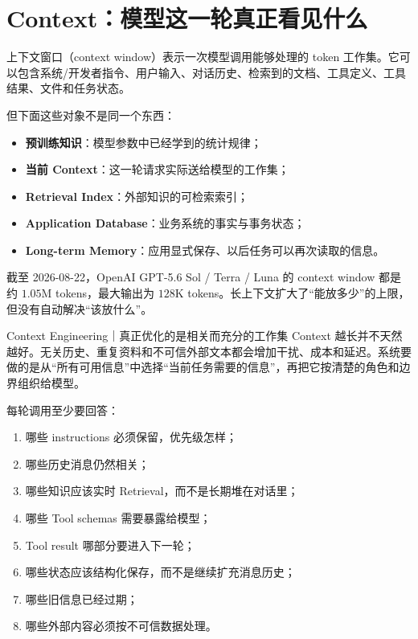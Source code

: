 \documentclass[profile=standard,twoside=false]{ipara-handbook}
\begin{document}
\section{Context：模型这一轮真正看见什么}

上下文窗口（context window）表示一次模型调用能够处理的 token 工作集。它可以包含系统/开发者指令、用户输入、对话历史、检索到的文档、工具定义、工具结果、文件和任务状态。

但下面这些对象不是同一个东西：

\begin{itemize}
  \item \textbf{预训练知识}：模型参数中已经学到的统计规律；
  \item \textbf{当前 Context}：这一轮请求实际送给模型的工作集；
  \item \textbf{Retrieval Index}：外部知识的可检索索引；
  \item \textbf{Application Database}：业务系统的事实与事务状态；
  \item \textbf{Long-term Memory}：应用显式保存、以后任务可以再次读取的信息。
\end{itemize}

截至 2026-08-22，OpenAI GPT-5.6 Sol / Terra / Luna 的 context window 都是约 $1.05$M tokens，最大输出为 $128$K tokens。长上下文扩大了“能放多少”的上限，但没有自动解决“该放什么”。

\begin{mechanism}{Context Engineering｜真正优化的是相关而充分的工作集}
Context 越长并不天然越好。无关历史、重复资料和不可信外部文本都会增加干扰、成本和延迟。系统要做的是从“所有可用信息”中选择“当前任务需要的信息”，再把它按清楚的角色和边界组织给模型。
\end{mechanism}

每轮调用至少要回答：

\begin{enumerate}
  \item 哪些 instructions 必须保留，优先级怎样；
  \item 哪些历史消息仍然相关；
  \item 哪些知识应该实时 Retrieval，而不是长期堆在对话里；
  \item 哪些 Tool schemas 需要暴露给模型；
  \item Tool result 哪部分要进入下一轮；
  \item 哪些状态应该结构化保存，而不是继续扩充消息历史；
  \item 哪些旧信息已经过期；
  \item 哪些外部内容必须按不可信数据处理。
\end{enumerate}
\end{document}
